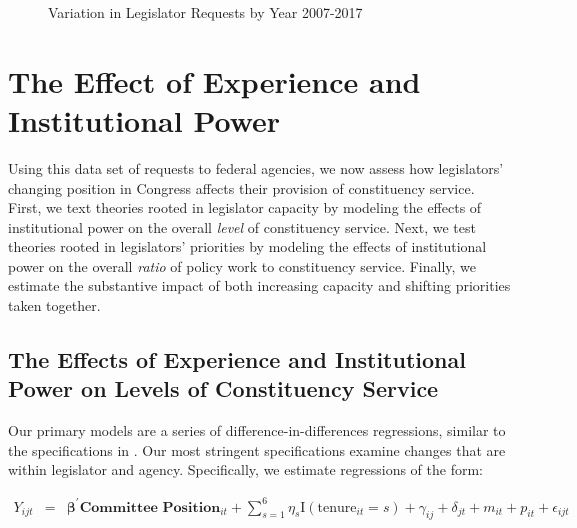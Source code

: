 \documentclass[12pt]{article}
\begin{document}
\begin{figure}
\centering
\caption{Variation in Legislator Requests by Year 2007-2017} \label{f:peryear} 
\begin{minipage}{\textwidth}
\end{minipage}
\end{figure}






\section{The Effect of Experience and Institutional Power}\label{s:results} 

Using this data set of requests to federal agencies, we now assess how legislators' changing position in Congress affects their provision of constituency service. First, we text theories rooted in legislator capacity by modeling the effects of institutional power on the overall \textit{level} of constituency service. Next, we test theories rooted in legislators' priorities by modeling the effects of institutional power on the overall \textit{ratio} of policy work to constituency service. Finally, we estimate the substantive impact of both increasing capacity and shifting priorities taken together. 

\subsection{The Effects of Experience and Institutional Power on Levels of Constituency Service}\label{s:prestige}

 Our primary models are a series of difference-in-differences regressions, similar to the specifications in \cite{BerryFowler2016}. Our most stringent specifications examine changes that are within legislator and agency. Specifically, we estimate regressions of the form: 

\begin{eqnarray}
Y_{ijt} & = & \boldsymbol{\beta}^{'} \textbf{Committee Position}_{it}  + \sum_{s = 1}^{6} \eta_{s} \text{I}\left(\text{tenure}_{it} = s\right) + \gamma_{ij} + \delta_{jt} + m_{it} + p_{it} + \epsilon_{ijt} \label{e:diff1}
\end{eqnarray}
\end{document}
